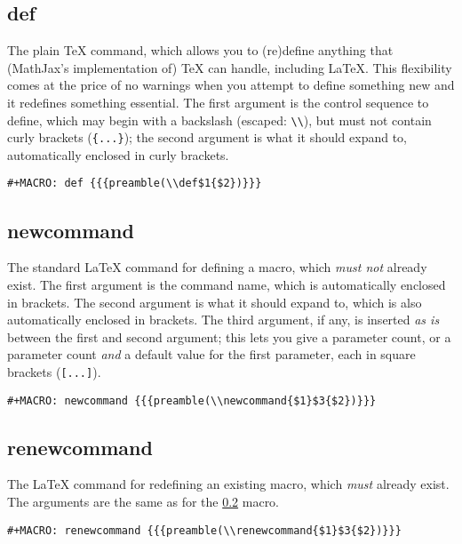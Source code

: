 \documentclass[11pt]{article}
\begin{document}
\subsection{def}
\label{sec-2-1}

The plain \TeX{} command, which allows you to (re)define anything that
(MathJax's implementation of) \TeX{} can handle, including \LaTeX{}.  This
flexibility comes at the price of no warnings when you attempt to
define something new and it redefines something essential.  The first
argument is the control sequence to define, which may begin with a
backslash (escaped: \verb~\\~), but must not contain curly brackets
(\verb~{...}~); the second argument is what it should expand to,
automatically enclosed in curly brackets.

\begin{verbatim}
#+MACRO: def {{{preamble(\\def$1{$2})}}}
\end{verbatim}

\subsection{newcommand}
\label{sec-2-2}

The standard \LaTeX{} command for defining a macro, which \emph{must not}
already exist.  The first argument is the command name, which is
automatically enclosed in brackets.  The second argument is what it
should expand to, which is also automatically enclosed in brackets.
The third argument, if any, is inserted \emph{as is} between the first and
second argument; this lets you give a parameter count, or a parameter
count \emph{and} a default value for the first parameter, each in square
brackets (\verb~[...]~).

\begin{verbatim}
#+MACRO: newcommand {{{preamble(\\newcommand{$1}$3{$2})}}}
\end{verbatim}

\subsection{renewcommand}
\label{sec-2-3}

The \LaTeX{} command for redefining an existing macro, which \emph{must}
already exist.  The arguments are the same as for the \ref{sec-2-2}
macro.

\begin{verbatim}
#+MACRO: renewcommand {{{preamble(\\renewcommand{$1}$3{$2})}}}
\end{verbatim}
\end{document}
